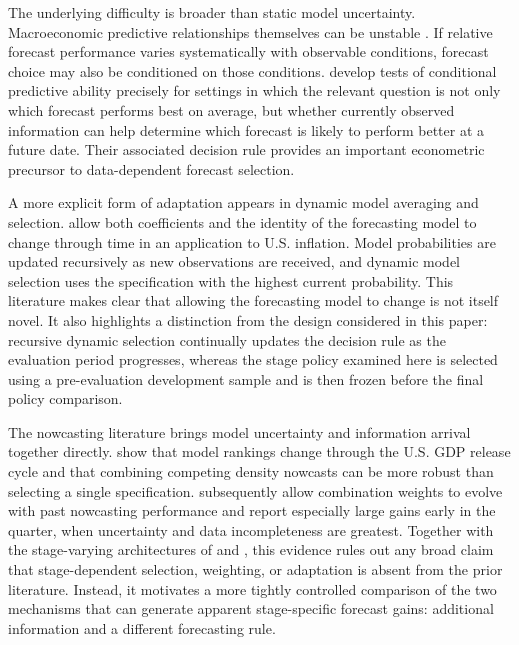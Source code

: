 The underlying difficulty is broader than static model uncertainty.
Macroeconomic predictive relationships themselves can be unstable
\citep{stockwatson1996instability,rossi2021instability}. If relative forecast
performance varies systematically with observable conditions, forecast choice
may also be conditioned on those conditions. \citet{giacominiwhite2006conditional}
develop tests of conditional predictive ability precisely for settings in which
the relevant question is not only which forecast performs best on average, but
whether currently observed information can help determine which forecast is
likely to perform better at a future date. Their associated decision rule
provides an important econometric precursor to data-dependent forecast
selection.

A more explicit form of adaptation appears in dynamic model averaging and
selection. \citet{koopkorobilis2012dma} allow both coefficients and the identity
of the forecasting model to change through time in an application to U.S.
inflation. Model probabilities are updated recursively as new observations are
received, and dynamic model selection uses the specification with the highest
current probability. This literature makes clear that allowing the forecasting
model to change is not itself novel. It also highlights a distinction from the
design considered in this paper: recursive dynamic selection continually
updates the decision rule as the evaluation period progresses, whereas the
stage policy examined here is selected using a pre-evaluation development
sample and is then frozen before the final policy comparison.

The nowcasting literature brings model uncertainty and information arrival
together directly. \citet{aastveit2014density} show that model rankings change
through the U.S. GDP release cycle and that combining competing density
nowcasts can be more robust than selecting a single specification.
\citet{aastveit2018combined} subsequently allow combination weights to evolve
with past nowcasting performance and report especially large gains early in the
quarter, when uncertainty and data incompleteness are greatest. Together with
the stage-varying architectures of \citet{drechselmaurin2011flow} and
\citet{moreira2025scmidas}, this evidence rules out any broad claim that
stage-dependent selection, weighting, or adaptation is absent from the prior
literature. Instead, it motivates a more tightly controlled comparison of the
two mechanisms that can generate apparent stage-specific forecast gains:
additional information and a different forecasting rule.


